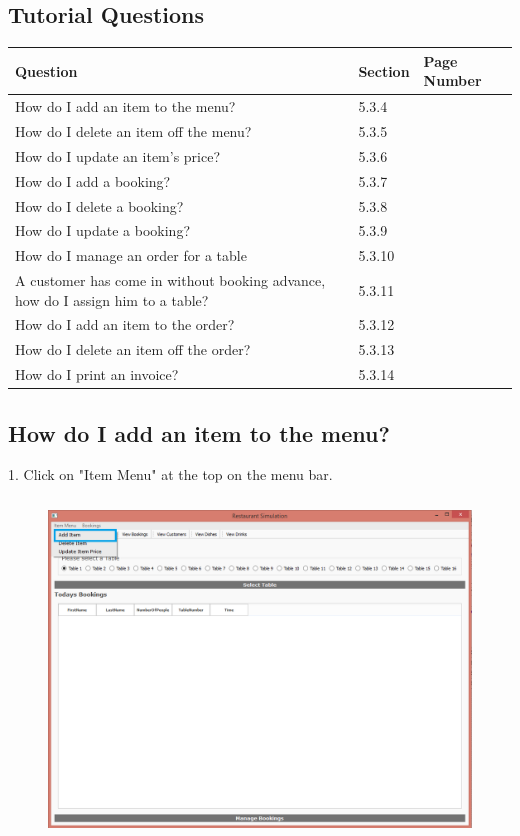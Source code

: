 \subsection{Tutorial Questions}

\begin{center}
\begin{tabular}{|p{8cm}|p{2cm}|p{2cm}|}
    \hline
    \textbf{Question} & \textbf{Section} & \textbf{Page Number} \\ \hline
 How do I add an item to the menu? & 5.3.4 & \\ \hline
How do I delete an item off the menu? & 5.3.5 & \\ \hline
 How do I update an item's price?& 5.3.6 & \\ \hline
 How do I add a booking? & 5.3.7 & \\ \hline
 How do I delete a booking? & 5.3.8 & \\ \hline
 How do I update a booking? & 5.3.9 & \\ \hline
How do I manage an order for a table & 5.3.10 \\ \hline
 A customer has come in without booking advance, how do I assign him to a table? & 5.3.11 & \\ \hline
How do I add an item to the order? & 5.3.12& \\ \hline
 How do I delete an item off the order? & 5.3.13 & \\ \hline
 How do I print an invoice? & 5.3.14& \\ 

    \hline
\end{tabular}
\end{center}

\subsection{How do I add an item to the menu?}

1. Click on "Item Menu" at the top on the menu bar.
\begin{figure}[H]
    \includegraphics[height = 9cm]{./Manual/images/AddItem1} 
    \caption{} \label{fig:additem1}
\end{figure}

